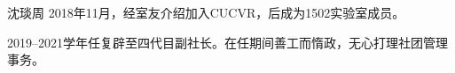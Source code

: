 \begin{section}{沈琰周}
	\label{person:沈琰周}
	2018年11月，经室友介绍加入CUCVR，后成为1502实验室成员。
	
	2019--2021学年任复辟至四代目副社长。在任期间善工而惰政，无心打理社团管理事务。
\end{section}